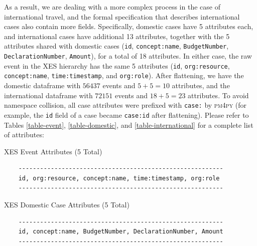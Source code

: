 \documentclass[conference]{IEEEtran}
\begin{document}
As a result, we are dealing with a more complex process in the case of
international travel, and the formal specification that describes
international cases also contain more fields.
Specifically, domestic cases have 5 attributes
each, and international cases have additional 13 attributes, together
with the 5 attributes shared with domestic cases
(\texttt{id}, \texttt{concept:name}, \texttt{BudgetNumber},
\texttt{DeclarationNumber}, \texttt{Amount}), for a total of 18 attributes.
In either case,
the raw event in the XES hierarchy has the same 5 attributes
(\texttt{id}, \texttt{org:resource}, \texttt{concept:name},
\texttt{time:timestamp}, and \texttt{org:role}).
After flattening, we
have the domestic dataframe with $56437$ events and $5+5=10$ attributes, and
the international dataframe with $72151$ events and $18+5=23$ attributes.
To avoid namespace collision, all case attributes were prefixed with
\texttt{case:} by \textsc{pm4py} (for example, the \texttt{id} field of a case
became \texttt{case:id} after flattening). Please refer to Tables
\ref{table-event}, 
\ref{table-domestic}, and
\ref{table-international} for a complete list of attributes:

\begin{table}[htbp]
\caption{XES Event Attributes (5 Total)}
\begin{center}
\begin{verbatim}
    ---------------------------------------------------------
    id, org:resource, concept:name, time:timestamp, org:role
    ---------------------------------------------------------
\end{verbatim}
\end{center}
\label{table-event}
\end{table}

\begin{table}[htbp]
\caption{XES Domestic Case Attributes (5 Total)}
\begin{center}
\begin{verbatim}
    ---------------------------------------------------------
    id, concept:name, BudgetNumber, DeclarationNumber, Amount
    ---------------------------------------------------------
\end{verbatim}
\end{center}
\label{table-domestic}
\end{table}
\end{document}
